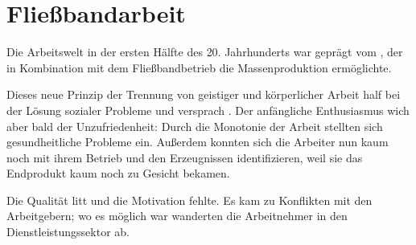 \section{Fließbandarbeit}
\label{ssc:fliessbarb}

Die Arbeitswelt in der ersten Hälfte des 20. Jahrhunderts war geprägt
vom , der in Kombination mit dem Fließbandbetrieb die
Massenproduktion ermöglichte.

Dieses neue Prinzip der Trennung von geistiger und körperlicher Arbeit
half bei der Lösung sozialer Probleme und versprach . Der anfängliche Enthusiasmus wich aber bald der
Unzufriedenheit: Durch die Monotonie der Arbeit stellten sich
gesundheitliche Probleme ein. Außerdem konnten sich die Arbeiter nun
kaum noch mit ihrem Betrieb und den Erzeugnissen identifizieren, weil
sie das Endprodukt kaum noch zu Gesicht bekamen.

Die Qualität litt und die Motivation fehlte. Es kam zu Konflikten mit
den Arbeitgebern; wo es möglich war wanderten die Arbeitnehmer in den
Dienstleistungssektor ab.

\endinput
